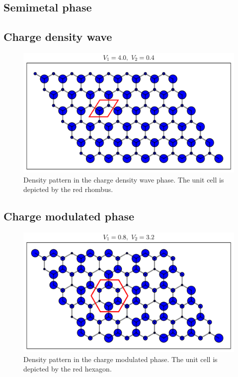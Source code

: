 \documentclass[aps,prx,10pt,twocolumn,floatfix,superscriptaddress,showpacs,numerical,footinbib]{revtex4-1}
\begin{document}
%
\subsection{Semimetal phase}
%
\subsection{Charge density wave}
%
\begin{figure}
 \includegraphics[width=\columnwidth]{pdf/cdw.pdf}
 \caption{Density pattern in the charge density wave phase. The unit cell is depicted by the red rhombus.  \label{fig:cdw}}
\end{figure}

\subsection{Charge modulated phase}
%
\begin{figure}
 \includegraphics[width=\columnwidth]{pdf/cms.pdf}
 \caption{Density pattern in the charge modulated phase. The unit cell is depicted by the red hexagon.  \label{fig:cms}}
\end{figure}
\end{document}
